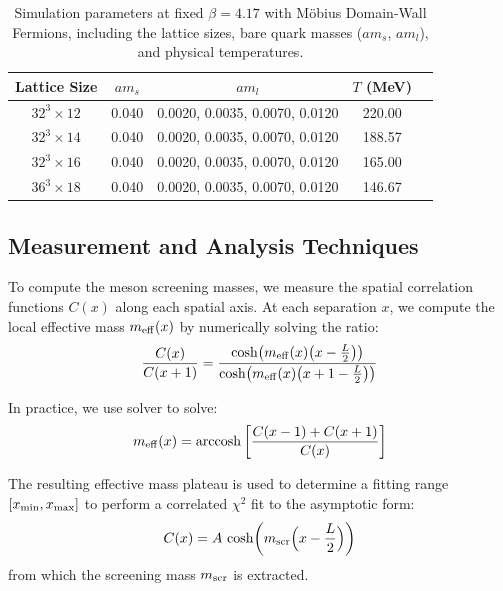 \begin{table}[H]
\centering
\renewcommand{\arraystretch}{1.2}
\caption{Simulation parameters at fixed $\beta = 4.17$ with Möbius Domain-Wall Fermions, including the lattice sizes, bare quark masses ($am_s$, $am_l$), and physical temperatures.}
\label{tab:fixed_beta_setup}
\begin{tabular}{ccccc}
\hline\hline
Lattice Size & $am_s$ & $am_l$ & $T$ (MeV) \\
\hline
$32^3 \times 12$ & 0.040 & 0.0020, 0.0035, 0.0070, 0.0120 & 220.00 \\
$32^3 \times 14$ & 0.040 & 0.0020, 0.0035, 0.0070, 0.0120 & 188.57 \\
$32^3 \times 16$ & 0.040 & 0.0020, 0.0035, 0.0070, 0.0120 & 165.00 \\
$36^3 \times 18$ & 0.040 & 0.0020, 0.0035, 0.0070, 0.0120 & 146.67 \\
\hline\hline
\end{tabular}
\end{table}


\subsection{Measurement and Analysis Techniques}
To compute the meson screening masses, we measure the spatial correlation functions $C(x)$ along each spatial axis. At each separation $x$, we compute the local effective mass $m_{\rm eff}(x)$ by numerically solving the ratio:
\begin{equation}
    \frac{C(x)}{C(x+1)} = \frac{\cosh\!\left(m_{\rm eff}(x)\bigl(x - \tfrac{L}{2}\bigr)\right)}{\cosh\!\left(m_{\rm eff}(x)\bigl(x + 1 - \tfrac{L}{2}\bigr)\right)}
\end{equation}

In practice, we use solver to solve:
\begin{equation}
    m_{\rm eff}(x) = \operatorname{arccosh}\left[\frac{C(x-1)+C(x+1)}{C(x)}\right]
\end{equation}

The resulting effective mass plateau is used to determine a fitting range $[x_{\rm min}, x_{\rm max}]$ to perform a correlated $\chi^2$ fit to the asymptotic form:
\begin{equation}
    C(x) = A\,\cosh\!\left(m_{\rm scr}\Bigl(x - \frac{L}{2}\Bigr)\right)
\end{equation}
from which the screening mass $m_{\rm scr}$ is extracted.

